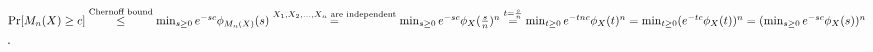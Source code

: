 \begin{pr}
$\mathrm{Pr}[M_n(X)\geq c]\overset{\text{Chernoff bound}}\leq\min_{s\geq0}e^{-sc}\phi_{M_n(X)}(s)\\
\overset{X_1, X_2, \dots, X_n\text{ are independent}}=\min_{s\geq0}e^{-sc}\phi_X(\frac sn)^n\\
\overset{t=\frac sn}=\min_{t\geq0}e^{-tnc}\phi_X(t)^n\\
=\min_{t\geq0}(e^{-tc}\phi_X(t))^n\\
=(\min_{s\geq0}e^{-sc}\phi_X(s))^n$.
\end{pr}
